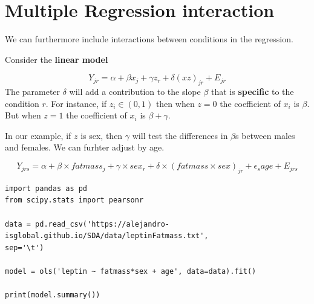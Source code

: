 \documentclass[
]{book}
\begin{document}
\hypertarget{multiple-regression-interaction}{%
\section{Multiple Regression interaction}\label{multiple-regression-interaction}}

We can furthermore include interactions between conditions in the regression.

Consider the \textbf{linear model}

\[Y_{jr} = \alpha + \beta x_{j} +\gamma z_{r} + \delta (xz)_{jr} +E_{jr}\]
The parameter \(\delta\) will add a contribution to the slope \(\beta\) that is \textbf{specific} to the condition \(r\). For instance, if \(z_i \in (0,1)\) then when \(z=0\) the coefficient of \(x_i\) is \(\beta\). But when \(z=1\) the coefficient of \(x_i\) is \(\beta+\gamma\).

In our example, if \(z\) is sex, then \(\gamma\) will test the differences in \(\beta\)s between males and females. We can furhter adjust by age.

\[Y_{jrs} = \alpha + \beta\times fatmass_{j} +\gamma\times sex_{r} + \delta\times (fatmass\times sex)_{jr} + \epsilon_s age+E_{jrs}\]

\begin{verbatim}
import pandas as pd
from scipy.stats import pearsonr

data = pd.read_csv('https://alejandro-isglobal.github.io/SDA/data/leptinFatmass.txt', 
sep='\t')

model = ols('leptin ~ fatmass*sex + age', data=data).fit()

print(model.summary())
\end{verbatim}
\end{document}
